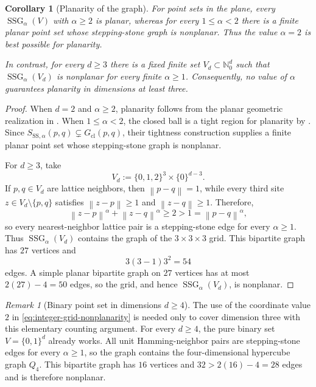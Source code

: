 \documentclass[a4paper,fleqn]{cas-sc}
\newtheorem{corollary}{Corollary}
\theoremstyle{definition}
\theoremstyle{remark}
\newtheorem{remark}{Remark}
\newcommand{\Nzero}{\mathds{N}_0}
\newcommand{\norm}[1]{\left\lVert #1\right\rVert}
\newcommand{\0}{\mathbf{0}}
\DeclareMathOperator{\SSG}{SSG}
\begin{document}
\begin{corollary}[Planarity of the graph]
\label{cor:sharp-planarity}
For point sets in the plane, every $\SSG_\alpha(V)$ with $\alpha\geq2$ is
planar, whereas for every $1\leq\alpha<2$ there is a finite planar point set
whose stepping-stone graph is nonplanar. Thus the value $\alpha=2$ is best
possible for planarity.

In contrast, for every $d\geq3$ there is a fixed finite set
$V_d\subset\Nzero^d$ such that $\SSG_\alpha(V_d)$ is nonplanar for every
finite $\alpha\geq1$. Consequently, no value of $\alpha$ guarantees
planarity in dimensions at least three.
\end{corollary}

\begin{proof}
When $d=2$ and $\alpha\geq2$, planarity follows from the planar geometric
realization in . When $1\leq\alpha<2$, the closed
ball is a tight region for planarity by
\citet[Theorem~24]{cardinal2009empty}. Since
$S_{\mathrm{SS},\alpha}(p,q)\subsetneq G_{\mathrm{cl}}(p,q)$, their
tightness construction supplies a finite planar point set whose
stepping-stone graph is nonplanar.

For $d\geq3$, take
\begin{equation}\label{eq:integer-grid-nonplanarity}
    V_d:=\{0,1,2\}^3\times\{0\}^{d-3}.
\end{equation}
If $p,q\in V_d$ are lattice neighbors, then $\norm{p-q}=1$, while every
third site $z\in V_d\setminus\{p,q\}$ satisfies
$\norm{z-p}\geq1$ and $\norm{z-q}\geq1$. Therefore,
\begin{equation}
    \norm{z-p}^\alpha+\norm{z-q}^\alpha
    \geq2>1=\norm{p-q}^\alpha,
\end{equation}
so every nearest-neighbor lattice pair is a stepping-stone edge for every
$\alpha\geq1$. Thus $\SSG_\alpha(V_d)$ contains the graph of the
$3\times3\times3$ grid. This bipartite graph has $27$ vertices and
\begin{equation}
    3(3-1)3^2=54
\end{equation}
edges. A simple planar bipartite graph on $27$ vertices has at most
$2(27)-4=50$ edges, so the grid, and hence $\SSG_\alpha(V_d)$, is
nonplanar.
\end{proof}

\begin{remark}[Binary point set in dimensions $d\geq4$]
The use of the coordinate value $2$ in
\eqref{eq:integer-grid-nonplanarity} is needed only to cover dimension
three with this elementary counting argument. For every $d\geq4$, the pure
binary set $V=\{0,1\}^d$ already works. All unit Hamming-neighbor pairs are
stepping-stone edges for every $\alpha\geq1$, so the graph contains the
four-dimensional hypercube graph $Q_4$. This bipartite graph has $16$
vertices and $32>2(16)-4=28$ edges and is therefore nonplanar.
\end{remark}
\end{document}
